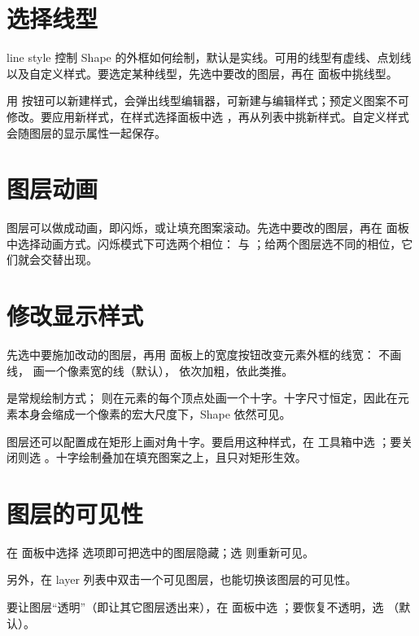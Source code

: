 \section{选择线型}\label{sec:line_style}

line style 控制 Shape 的外框如何绘制，默认是实线。可用的线型有虚线、点划线以及自定义样式。要选定某种线型，先选中要改的图层，再在  面板中挑线型。

用  按钮可以新建样式，会弹出线型编辑器，可新建与编辑样式；预定义图案不可修改。要应用新样式，在样式选择面板中选 ，再从列表中挑新样式。自定义样式会随图层的显示属性一起保存。

\section{图层动画}\label{sec:layer_animation}

图层可以做成动画，即闪烁，或让填充图案滚动。先选中要改的图层，再在  面板中选择动画方式。闪烁模式下可选两个相位： 与 ；给两个图层选不同的相位，它们就会交替出现。

\section{修改显示样式}\label{sec:layer_style}

先选中要施加改动的图层，再用  面板上的宽度按钮改变元素外框的线宽：\ui{0px} 不画线，\ui{1px} 画一个像素宽的线（默认），\ui{2px} 依次加粗，依此类推。

 是常规绘制方式； 则在元素的每个顶点处画一个十字。十字尺寸恒定，因此在元素本身会缩成一个像素的宏大尺度下，Shape 依然可见。

图层还可以配置成在矩形上画对角十字。要启用这种样式，在  工具箱中选 ；要关闭则选 。十字绘制叠加在填充图案之上，且只对矩形生效。

\section{图层的可见性}\label{sec:layer_visibility}

在  面板中选择  选项即可把选中的图层隐藏；选  则重新可见。

另外，在 layer 列表中双击一个可见图层，也能切换该图层的可见性。

要让图层“透明”（即让其它图层透出来），在  面板中选 ；要恢复不透明，选 （默认）。

